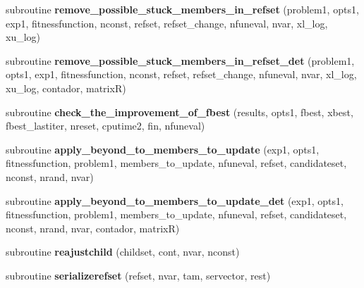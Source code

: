\begin{DoxyCompactItemize}
\item 
\hypertarget{classscattersearchfunctions_ad27df2c635f286af97d1122ef29ba61c}{subroutine {\bfseries remove\-\_\-possible\-\_\-stuck\-\_\-members\-\_\-in\-\_\-refset} (problem1, opts1, exp1, fitnessfunction, nconst, refset, refset\-\_\-change, nfuneval, nvar, xl\-\_\-log, xu\-\_\-log)}\label{classscattersearchfunctions_ad27df2c635f286af97d1122ef29ba61c}

\item 
\hypertarget{classscattersearchfunctions_a9df010f2ee84a1bae194c1898895faee}{subroutine {\bfseries remove\-\_\-possible\-\_\-stuck\-\_\-members\-\_\-in\-\_\-refset\-\_\-det} (problem1, opts1, exp1, fitnessfunction, nconst, refset, refset\-\_\-change, nfuneval, nvar, xl\-\_\-log, xu\-\_\-log, contador, matrix\-R)}\label{classscattersearchfunctions_a9df010f2ee84a1bae194c1898895faee}

\item 
\hypertarget{classscattersearchfunctions_ac18ba44fca8c62ec265e8f9718941536}{subroutine {\bfseries check\-\_\-the\-\_\-improvement\-\_\-of\-\_\-fbest} (results, opts1, fbest, xbest, fbest\-\_\-lastiter, nreset, cputime2, fin, nfuneval)}\label{classscattersearchfunctions_ac18ba44fca8c62ec265e8f9718941536}

\item 
\hypertarget{classscattersearchfunctions_a020041289959a93ed30a36acdbddfacc}{subroutine {\bfseries apply\-\_\-beyond\-\_\-to\-\_\-members\-\_\-to\-\_\-update} (exp1, opts1, fitnessfunction, problem1, members\-\_\-to\-\_\-update, nfuneval, refset, candidateset, nconst, nrand, nvar)}\label{classscattersearchfunctions_a020041289959a93ed30a36acdbddfacc}

\item 
\hypertarget{classscattersearchfunctions_a077be158373d1f0ef555df4ee585e97e}{subroutine {\bfseries apply\-\_\-beyond\-\_\-to\-\_\-members\-\_\-to\-\_\-update\-\_\-det} (exp1, opts1, fitnessfunction, problem1, members\-\_\-to\-\_\-update, nfuneval, refset, candidateset, nconst, nrand, nvar, contador, matrix\-R)}\label{classscattersearchfunctions_a077be158373d1f0ef555df4ee585e97e}

\item 
\hypertarget{classscattersearchfunctions_a2c186479ff919ee0c7f498e367031d68}{subroutine {\bfseries reajustchild} (childset, cont, nvar, nconst)}\label{classscattersearchfunctions_a2c186479ff919ee0c7f498e367031d68}

\item 
\hypertarget{classscattersearchfunctions_a25d73f489cc60684b8c12047eefff40c}{subroutine {\bfseries serializerefset} (refset, nvar, tam, servector, rest)}\label{classscattersearchfunctions_a25d73f489cc60684b8c12047eefff40c}


\end{DoxyCompactItemize}
